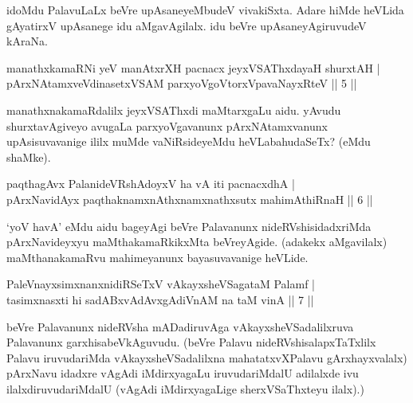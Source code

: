 \begin{artha} 
idoMdu PalavuLaLx beVre upAsaneyeMbudeV vivakiSxta. Adare hiMde 
heVLida gAyatirxV upAsanege idu aMgavAgilalx. idu beVre 
upAsaneyAgiruvudeV kAraNa.
\end{artha}


\begin{shl}
manathxkamaRNi yeV manAtxrXH pacnacx jeyxVSAThxdayaH shurxtAH | \\
pArxNAtamxveVdinasetxVSAM parxyoVgoV\s torxVpavaNayxRteV \hfill|| 5 || 
\end{shl}

\begin{artha} 
manathxnakamaRdalilx jeyxVSAThxdi maMtarxgaLu aidu. yAvudu 
shurxtavAgiveyo avugaLa parxyoVgavanunx pArxNAtamxvanunx 
upAsisuvavanige ililx muMde vaNiRsideyeMdu heVLabahudaSeTx? (eMdu 
shaMke).
\end{artha}


\begin{shl}
paqthagAvx PalanideVRshAdoyxV ha vA iti pacnacxdhA | \\
pArxNavidAyx paqthaknamxnAthxnamxnathxsutx mahimAthiRnaH \hfill|| 6 || 
\end{shl}

\begin{artha} 
`yoV havA' eMdu aidu bageyAgi beVre Palavanunx nideRVshisidadxriMda 
pArxNavideyxyu maMthakamaRkikxMta beVreyAgide. (adakekx aMgavilalx) 
maMthanakamaRvu mahimeyanunx bayasuvavanige heVLide.
\end{artha}


\begin{shl}
PaleV\s nayxsimxnanxnidiRSeTxV vAkayxsheVSagataM Palamf | \\
tasimxnasxti hi sadABxvAdAvxgAdiVnAM na taM vinA \hfill|| 7 || 
\end{shl}

\begin{artha} 
beVre Palavanunx nideRVsha mADadiruvAga vAkayxsheVSadalilxruva 
Palavanunx garxhisabeVkAguvudu. (beVre Palavu nideRVshisalapxTaTxlilx 
Palavu iruvudariMda vAkayxsheVSadalilxna mahatatxvXPalavu 
gArxhayxvalalx) pArxNavu idadxre vAgAdi iMdirxyagaLu iruvudariMdalU 
adilalxde ivu ilalxdiruvudariMdalU (vAgAdi iMdirxyagaLige 
sherxVSaThxteyu ilalx).)
\end{artha}

